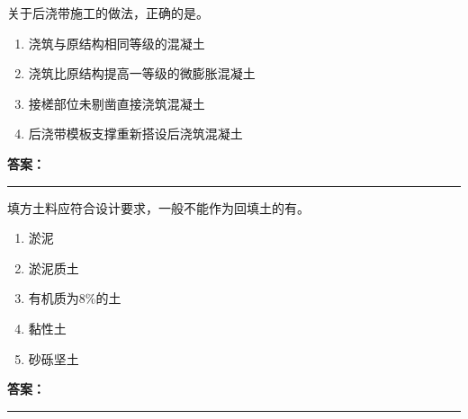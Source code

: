 \documentclass[UTF8,fontset=fandol,11pt]{ctexart}
\newcommand{\answerline}{\textcolor{answerred}{\rule{2.4cm}{0.7pt}}}
\begin{document}
\begin{quizbox}[title={乱序第 229 题｜第四章混凝土结构工程}]

关于后浇带施工的做法，正确的是。\\

\begin{enumerate}[label=\Alph*.]

\item 浇筑与原结构相同等级的混凝土

\item 浇筑比原结构提高一等级的微膨胀混凝土

\item 接槎部位未剔凿直接浇筑混凝土

\item 后浇带模板支撑重新搭设后浇筑混凝土

\end{enumerate}

\textbf{\textcolor{answerred}{答案：}} \answerline

\end{quizbox}

\vspace{0.2em}

\begin{quizbox}[title={乱序第 230 题｜第一章土方工程}]

填方土料应符合设计要求，一般不能作为回填土的有。\\

\begin{enumerate}[label=\Alph*.]

\item 淤泥

\item 淤泥质土

\item 有机质为8\%的土

\item 黏性土

\item 砂砾坚土

\end{enumerate}

\textbf{\textcolor{answerred}{答案：}} \answerline

\end{quizbox}

\vspace{0.2em}
\end{document}
